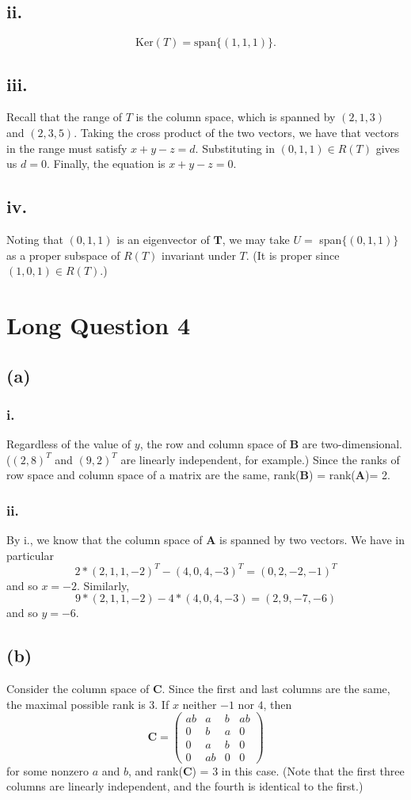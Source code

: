 \documentclass{article}
\begin{document}
\subsection*{ii.}
\[\text{Ker}(T) = \text{span}\{(1,1,1)\}.\] 
\subsection*{iii.}
Recall that the range of $T$ is the column space, which is spanned by $(2,1,3)$ and $(2,3,5)$. Taking the cross product of the two vectors, we have that vectors in the range must satisfy $x+y-z = d$. Substituting in $(0,1,1) \in R(T)$ gives us $d = 0$. Finally, the equation is $x+y-z=0$.
\subsection*{iv.}
Noting that $(0,1,1)$ is an eigenvector of $\mathbf{T}$, we may take $U = $ span$\{(0,1,1)\}$ as a proper subspace of $R(T)$ invariant under $T$. (It is proper since $(1,0,1) \in R(T)$.)
\section*{Long Question 4}
\subsection*{(a)}
\subsubsection*{i.}
Regardless of the value of $y$, the row and column space of $\mathbf{B}$ are two-dimensional. ($(2,8)^T$ and $(9,2)^T$ are linearly independent, for example.) Since the ranks of row space and column space of a matrix are the same, rank($\mathbf{B}$) = rank($\mathbf{A}$)= 2.
\subsubsection*{ii.}
By i., we know that the column space of $\mathbf{A}$ is spanned by two vectors. We have in particular\[2*(2,1,1,-2)^T - (4,0,4,-3)^T = (0,2,-2,-1)^T \]and so $x = -2$. Similarly, \[9*(2,1,1,-2) - 4*(4,0,4,-3) = (2,9,-7,-6)\] and so $y = -6$.
\subsection*{(b)}
Consider the column space of $\mathbf{C}$. Since the first and last columns are the same, the maximal possible rank is 3. If $x$ neither $-1$ nor $4$, then 
\[\mathbf{C} = \begin{pmatrix}
    ab & a & b & ab \\
    0 & b & a & 0 \\
    0 & a & b & 0 \\
    0 & ab & 0 & 0
\end{pmatrix}\] for some nonzero $a$ and $b$, and rank($\mathbf{C}$) = $3$ in this case. (Note that the first three columns are linearly independent, and the fourth is identical to the first.)
\end{document}
